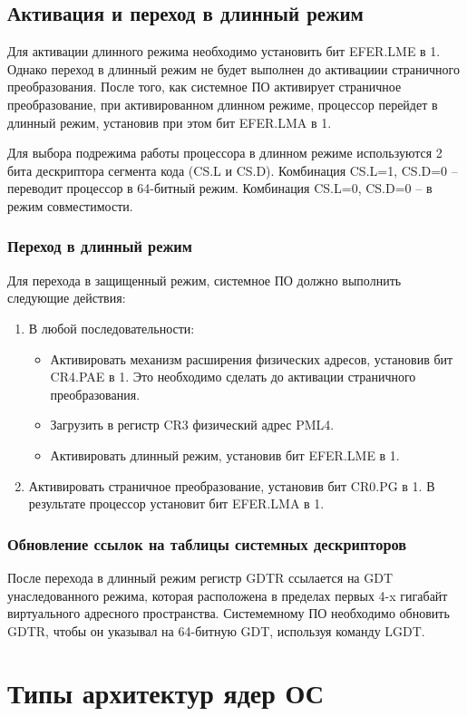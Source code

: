 \subsection{Активация и переход в длинный режим}
Для активации длинного режима необходимо установить бит EFER.LME в 1. Однако переход в длинный режим
не будет выполнен до активациии страничного преобразования. После того, как системное ПО
активирует страничное преобразование, при активированном длинном режиме, процессор перейдет в
длинный режим, установив при этом бит EFER.LMA в 1.

Для выбора подрежима работы процессора в длинном режиме используются 2 бита дескриптора сегмента кода (CS.L и CS.D).
Комбинация CS.L=1, CS.D=0 -- переводит процессор в 64-битный режим. Комбинация CS.L=0, CS.D=0 -- в
режим совместимости.

\subsubsection*{Переход в длинный режим}
Для перехода в защищенный режим, системное ПО должно выполнить следующие действия:
\begin{enumerate}[1.]
\item В любой последовательности:
	\begin{itemize}
	\item Активировать механизм расширения физических адресов, установив бит CR4.PAE в 1. Это
		необходимо сделать до активации страничного преобразования.
	\item Загрузить в регистр CR3 физический адрес PML4.
	\item Активировать длинный режим, установив бит EFER.LME в 1.
	\end{itemize}
\item Активировать страничное преобразование, установив бит CR0.PG в 1. В результате процессор установит бит EFER.LMA в 1.
\end{enumerate}

\subsubsection*{Обновление ссылок на таблицы системных дескрипторов}
После перехода в длинный режим регистр GDTR ссылается на GDT унаследованного режима, которая расположена
в пределах первых 4-x гигабайт виртуального адресного пространства. Системемному ПО необходимо обновить GDTR,
чтобы он указывал на 64-битную GDT, используя команду LGDT.


\section{Типы архитектур ядер ОС}
